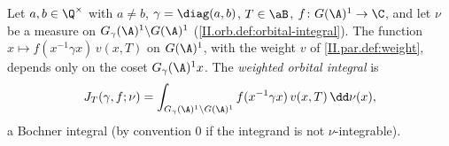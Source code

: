 Let $a,b\in\Q^\times$ with $a\neq b$, $\gamma=\diag(a,b)$, $T\in\aB$, $f\colon G(\A)^1\to\C$, and let $\nu$ be a measure on
$G_\gamma(\A)^1\backslash G(\A)^1$ (\cref{II.orb.def:orbital-integral}). The function $x\mapsto f(x^{-1}\gamma x)\,v(x,T)$ on $G(\A)^1$, with the weight $v$ of
\cref{II.par.def:weight}, depends only on the coset $G_\gamma(\A)^1x$. The \emph{weighted orbital integral} is
\[
  J_T(\gamma,f;\nu)=\int_{G_\gamma(\A)^1\backslash G(\A)^1}f(x^{-1}\gamma x)\,v(x,T)\,\dd\nu(x),
\]
a Bochner integral (by convention $0$ if the integrand is not $\nu$-integrable).
